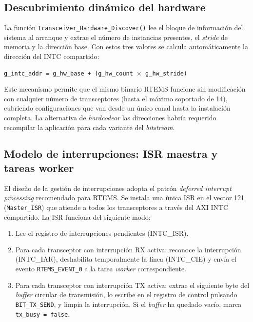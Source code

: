 \subsection{Descubrimiento dinámico del hardware}

La función \texttt{Transceiver\_Hardware\_Discover()} lee el bloque de información del sistema al
arranque y extrae el número de instancias presentes, el \textit{stride} de memoria y la dirección
base. Con estos tres valores se calcula automáticamente la dirección del INTC compartido:

\begin{center}
\texttt{g\_intc\_addr = g\_hw\_base + (g\_hw\_count $\times$ g\_hw\_stride)}
\end{center}

Este mecanismo permite que el mismo binario RTEMS funcione sin modificación con cualquier
número de transceptores (hasta el máximo soportado de 14), cubriendo configuraciones que
van desde un único canal hasta la instalación completa. La alternativa de \textit{hardcodear} las
direcciones habría requerido recompilar la aplicación para cada variante del \textit{bitstream}.

\subsection{Modelo de interrupciones: ISR maestra y tareas worker}

El diseño de la gestión de interrupciones adopta el patrón \textit{deferred interrupt processing}
recomendado para RTEMS. Se instala una única ISR en el vector 121 (\texttt{Master\_ISR}) que
atiende a todos los transceptores a través del AXI INTC compartido. La ISR funciona del
siguiente modo:

\begin{enumerate}
    \item Lee el registro de interrupciones pendientes (INTC\_ISR).
    \item Para cada transceptor con interrupción RX activa: reconoce la interrupción
    (INTC\_IAR), deshabilita temporalmente la línea (INTC\_CIE) y envía el evento
    \texttt{RTEMS\_EVENT\_0} a la tarea \textit{worker} correspondiente.
    \item Para cada transceptor con interrupción TX activa: extrae el siguiente byte del
    \textit{buffer} circular de transmisión, lo escribe en el registro de control pulsando
    \texttt{BIT\_TX\_SEND}, y limpia la interrupción. Si el \textit{buffer} ha quedado vacío, marca
    \texttt{tx\_busy = false}.
\end{enumerate}

